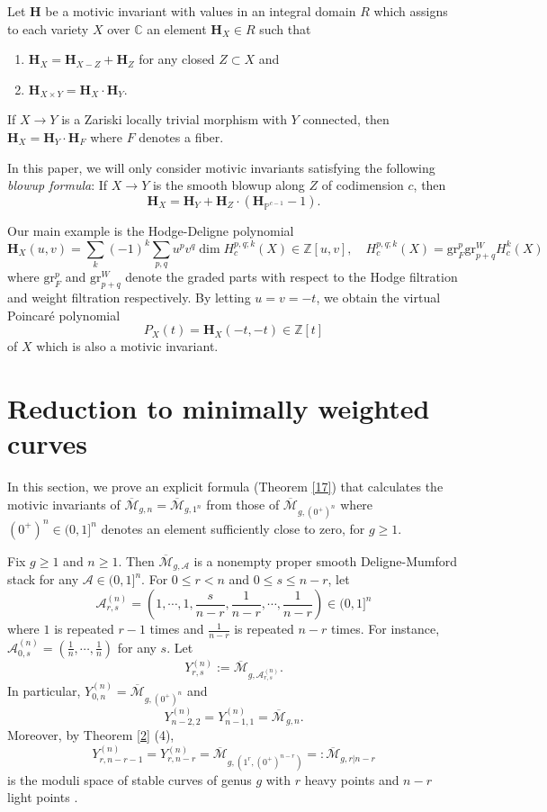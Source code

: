 \documentclass[11pt]{amsart}
\numberwithin{equation}{section}
\theoremstyle{definition}
\newcommand{\CC}{\mathbb{C}}
\newcommand{\PP}{\mathbb{P}}
\newcommand{\ZZ}{\mathbb{Z}}
\newcommand{\bH}{\mathbf{H}}
\def\cA{{\mathcal A}}
\def\cM{{\mathcal M}}
\def\beq{\begin{equation}}
\def\eeq{\end{equation}}
\def\bcM{\overline{\cM}}
\def\cAn{\cA^{(n)}}
\def\Yn{Y^{(n)}}
\begin{document}
\medskip

Let $\bH$ be a motivic invariant with values in an integral domain $R$ which assigns 
to each variety $X$ over $\CC$ an element $\bH_X\in R$ such that  
\begin{enumerate}
    \item $\bH_X=\bH_{X-Z}+\bH_Z$ for any closed $Z\subset X$ and
    \item $\bH_{X\times Y}=\bH_X\cdot \bH_Y.$
\end{enumerate}
If $X\to Y$ is a Zariski locally trivial morphism with $Y$ connected, then $\bH_X=\bH_Y\cdot \bH_F$ where $F$ denotes a fiber. 

In this paper, we will only consider motivic invariants satisfying the following \emph{blowup formula}: If $X\to Y$ is the smooth blowup along $Z$ of codimension $c$, then %
\beq\label{12}
\bH_X=\bH_Y + \bH_Z \cdot (\bH_{\PP^{c-1}}-1).\eeq 

Our main example is the Hodge-Deligne polynomial
$$\bH_X(u,v)=\sum_k (-1)^k\sum_{p,q}u^pv^q\dim H^{p,q;k}_c(X) \in \ZZ[u,v], \quad H^{p,q;k}_c(X)=\mathrm{gr}^p_F\mathrm{gr}_{p+q}^W H^k_c(X)$$
where $\mathrm{gr}_F^p$ and $\mathrm{gr}^W_{p+q}$ denote the graded parts with respect to the Hodge filtration and weight filtration respectively. 
By letting $u=v=-t$, we obtain the virtual Poincar\'e polynomial
$$P_X(t)=\bH_X(-t,-t)\in \ZZ[t]$$
of $X$ which is also a motivic invariant.


\bigskip

\section{Reduction to minimally weighted curves}
In this section, we prove an explicit formula (Theorem \ref{17}) that calculates the motivic invariants of $\bcM_{g,n}=\bcM_{g,1^n}$ from those of $\bcM_{g,(0^+)^n}$ where $(0^+)^n\in (0,1]^n$ denotes an element sufficiently close to zero, for $g\ge 1$. 

Fix $g\ge 1$ and $n\ge 1$. Then $\bcM_{g,\cA}$ is a nonempty proper smooth Deligne-Mumford stack for any $\cA\in (0,1]^n$. 
For $0\le r< n$ and $0\le s\le n-r$, let
\beq\label{8} \cAn_{r,s}=(1,\cdots,1,\frac{s}{n-r},\frac1{n-r},\cdots,\frac1{n-r})\in (0,1]^n\eeq
where $1$ is repeated $r-1$ times and $\frac1{n-r}$ is repeated $n-r$ times. 
For instance, $\cAn_{0,s}=(\frac1n,\cdots,\frac1n)$ for any $s$. 
Let 
\beq\label{9} \Yn_{r,s}:=\bcM_{g,\cAn_{r,s}}.\eeq 
In particular, $\Yn_{0,n}=\bcM_{g,(0^+)^n}$ and 
\beq\label{11} \Yn_{n-2,2}=\Yn_{n-1,1}=\bcM_{g,n}.\eeq
Moreover, by Theorem \ref{2} (4),  
\beq\label{15} \Yn_{r,n-r-1}=\Yn_{r,n-r}=\bcM_{g,(1^r,(0^+)^{n-r})}=:\bcM_{g,r|n-r}\eeq
is the moduli space of stable curves of genus $g$ with $r$ heavy points and $n-r$ light points \cite{KSY}. 
\end{document}
